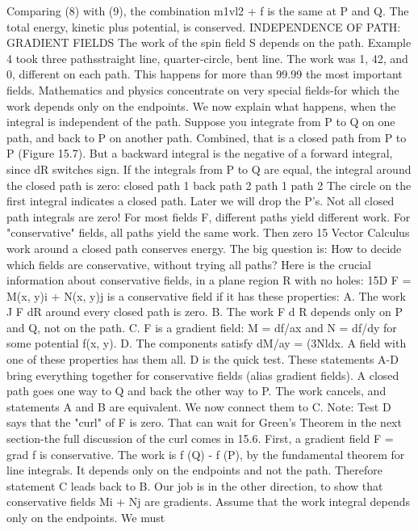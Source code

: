 Comparing (8) with (9), the combination m1vl2 + f is the same at P and Q. The total
energy, kinetic plus potential, is conserved.
INDEPENDENCE OF PATH: GRADIENT FIELDS
The work of the spin field S depends on the path. Example 4 took three pathsstraight
line, quarter-circle, bent line. The work was 1, 42, and 0, different on each
path. This happens for more than 99.99%
the most important fields. Mathematics and physics concentrate on very special
fields-for which the work depends only on the endpoints. We now explain what
happens, when the integral is independent of the path.
Suppose you integrate from P to Q on one path, and back to P on another path.
Combined, that is a closed path from P to P (Figure 15.7). But a backward integral
is the negative of a forward integral, since dR switches sign. If the integrals from P
to Q are equal, the integral around the closed path is zero:
closed path 1 back path 2 path 1 path 2
The circle on the first integral indicates a closed path. Later we will drop the P's.
Not all closed path integrals are zero! For most fields F, different paths yield
different work. For "conservative" fields, all paths yield the same work. Then zero 
15 Vector Calculus
work around a closed path conserves energy. The big question is: How to decide
which fields are conservative, without trying all paths? Here is the crucial information
about conservative fields, in a plane region R with no holes:
15D F = M(x, y)i + N(x, y)j is a conservative field if it has these properties:
A. The work J F dR around every closed path is zero.
B. The work F d R depends only on P and Q, not on the path.
C. F is a gradient field: M = df/ax and N = df/dy for some potential f(x, y).
D. The components satisfy dM/ay = (3Nldx.
A field with one of these properties has them all. D is the quick test.
These statements A-D bring everything together for conservative fields (alias gradient
fields). A closed path goes one way to Q and back the other way to P. The work
cancels, and statements A and B are equivalent. We now connect them to C. Note:
Test D says that the "curl" of F is zero. That can wait for Green's Theorem in the
next section-the full discussion of the curl comes in 15.6.
First, a gradient field F = grad f is conservative. The work is f (Q) - f (P), by the
fundamental theorem for line integrals. It depends only on the endpoints and not the
path. Therefore statement C leads back to B.
Our job is in the other direction, to show that conservative fields Mi + Nj are
gradients. Assume that the work integral depends only on the endpoints. We must
